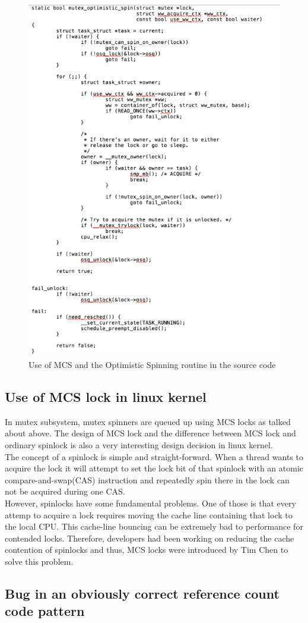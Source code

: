 \documentclass[10pt,preprint]{sigplanconf}
\begin{document}
\begin{figure}[h!]
	\includegraphics[scale=1]{image02.png}
	\caption{Use of MCS and the Optimistic Spinning routine in the source code}
\end{figure}


\subsection{Use of MCS lock in linux kernel}
In mutex subsystem, mutex spinners are queued up using MCS locks as talked about above. 
The design of MCS lock and the difference between MCS lock and ordinary spinlock is also a very interesting design decision in linux kernel.\\
The concept of a spinlock is simple and straight-forward. When a thread wants to acquire the lock it will attempt to set the lock bit of that spinlock with an atomic compare-and-swap(CAS) instruction and repeatedly spin there in the lock can not be acquired during one CAS. \\
However, spinlocks have some fundamental problems. One of those is that every attemp to acquire a lock requires moving the cache line containing that lock to the local CPU. This cache-line bouncing can be extremely bad to performance for contended locks. Therefore, developers had been working on reducing the cache contention of spinlocks and thus, MCS locks were introduced by Tim Chen to solve this problem.


\subsection{Bug in an obviously correct reference count code pattern}




% 
\end{document}
